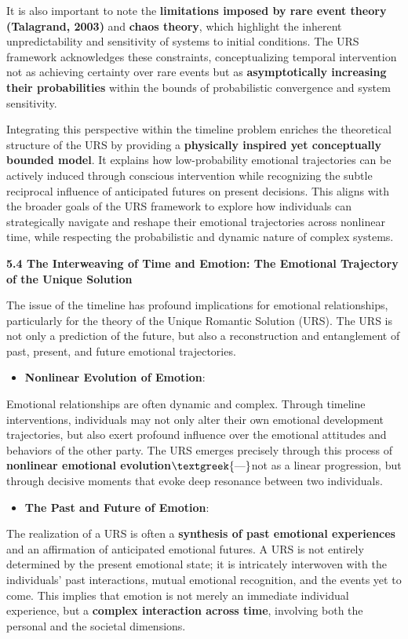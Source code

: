 \documentclass[a4paper]{article}
\begin{document}
It is also important to note the \textbf{limitations imposed by rare event theory (Talagrand, 2003)} and \textbf{chaos
theory}, which highlight the inherent unpredictability and sensitivity of systems to initial conditions. The URS
framework acknowledges these constraints, conceptualizing temporal intervention not as achieving certainty over rare
events but as \textbf{asymptotically increasing their probabilities} within the bounds of probabilistic convergence and
system sensitivity.

Integrating this perspective within the timeline problem enriches the theoretical structure of the URS by providing a
\textbf{physically inspired yet conceptually bounded model}. It explains how low-probability emotional trajectories can
be actively induced through conscious intervention while recognizing the subtle reciprocal influence of anticipated
futures on present decisions. This aligns with the broader goals of the URS framework to explore how individuals can
strategically navigate and reshape their emotional trajectories across nonlinear time, while respecting the
probabilistic and dynamic nature of complex systems.

\textbf{5.4 The Interweaving of Time and Emotion: The Emotional Trajectory of the Unique Solution}

The issue of the timeline has profound implications for emotional relationships, particularly for the theory of the
Unique Romantic Solution (URS). The URS is not only a prediction of the future, but also a reconstruction and
entanglement of past, present, and future emotional trajectories.

\begin{itemize}[series=listWWNumxvi,label=[F0B7?]]
\item \textbf{Nonlinear Evolution of Emotion}:
\end{itemize}
Emotional relationships are often dynamic and complex. Through timeline interventions, individuals may not only alter
their own emotional development trajectories, but also exert profound influence over the emotional attitudes and
behaviors of the other party. The URS emerges precisely through this process of \textbf{nonlinear emotional
evolution}$\text{\textgreek{—}}$not as a linear progression, but through decisive moments that evoke deep resonance
between two individuals.

\begin{itemize}[resume*=listWWNumxvi]
\item \textbf{The Past and Future of Emotion}:
\end{itemize}
The realization of a URS is often a \textbf{synthesis of past emotional experiences} and an affirmation of anticipated
emotional futures. A URS is not entirely determined by the present emotional state; it is intricately interwoven with
the individuals' past interactions, mutual emotional recognition, and the events yet to come. This implies that emotion
is not merely an immediate individual experience, but a \textbf{complex interaction across time}, involving both the
personal and the societal dimensions.
\end{document}
